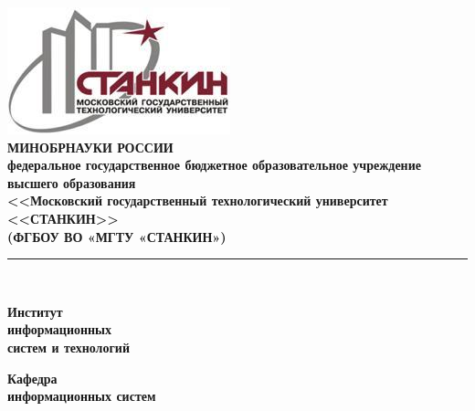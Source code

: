 \documentclass[12pt]{article}
\begin{document}
    \begin{titlepage}
    \center %
    \newcommand{\HRline}[1]{\rule{\linewidth}{#1}} %

    \includegraphics[scale=1]{images/logo.jpg}\\[1cm] %
    \textbf{\large МИНОБРНАУКИ РОССИИ}\\[0.5cm]
    \textbf{\large федеральное государственное бюджетное образовательное учреждение}\\[0.2cm]
    \textbf{\large высшего образования}\\[0.2cm]
    \textbf{\large <<Московский государственный технологический университет}\\[0.2cm]
    \textbf{<<СТАНКИН>>}\\[0.5cm]

    \textbf{\large (ФГБОУ ВО «МГТУ «СТАНКИН»)}
    \HRline{0.02cm} \\[0.1cm]

    \begin{multicols}{2}
        \begin{flushleft}
            \textbf{\large Институт}\\
            \textbf{\large информационных}\\
            \textbf{\large систем и технологий}\\
        \end{flushleft}
        
        \columnbreak
        \begin{flushleft}
            \textbf{\large Кафедра}\\
            \textbf{\large информационных систем}\\
        \end{flushleft}


\end{multicols}
\end{titlepage}
\end{document}
